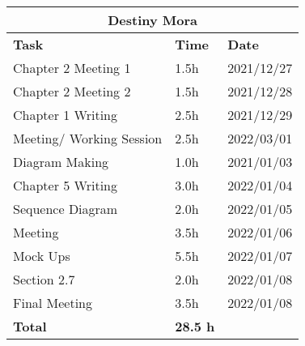 \begin{table}[H]
\centering
\begin{tabular}{|p{}|p{}|p{}|}
\hline
\multicolumn{3}{|c|}{\textbf{Destiny Mora}}\\\hline
\textbf{Task} & \textbf{Time} & \textbf{Date}\\\hline
Chapter 2 Meeting 1 		& 1.5h 	& 2021/12/27\\\hline
Chapter 2 Meeting 2 		& 1.5h 	& 2021/12/28\\\hline
Chapter 1 Writing 			& 2.5h 	& 2021/12/29\\\hline
Meeting/ Working Session 	& 2.5h 	& 2022/03/01\\\hline
Diagram Making 				& 1.0h 	& 2021/01/03\\\hline
Chapter 5 Writing 			& 3.0h 	& 2022/01/04\\\hline
Sequence Diagram 			& 2.0h 	& 2022/01/05\\\hline
Meeting						& 3.5h	& 2022/01/06\\\hline
Mock Ups					& 5.5h 	& 2022/01/07\\\hline
Section 2.7 				& 2.0h 	& 2022/01/08\\\hline
Final Meeting				& 3.5h	& 2022/01/08 \\\hline

\textbf{Total} & \textbf{28.5 h} &\\\hline
\end{tabular}
\end{table}

